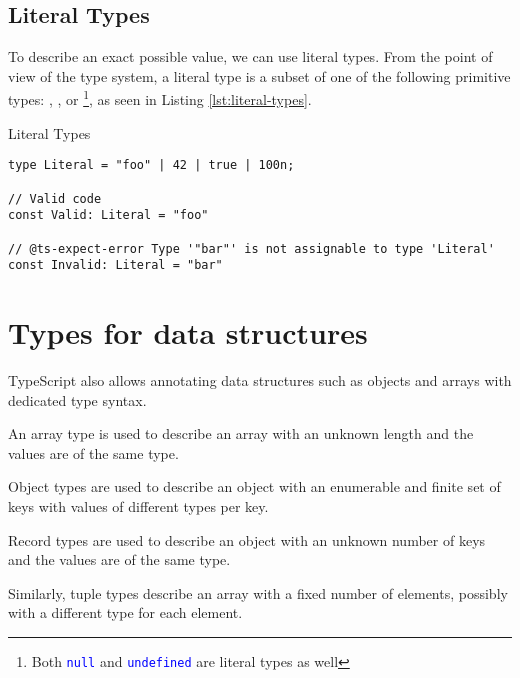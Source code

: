 \subsection{Literal Types}

To describe an exact possible value, we can use literal types. From the point of view of the type system, a literal type is a subset of one of the following primitive types: , ,  or \footnote{Both \texttt{\textcolor{blue}{null}} and \texttt{\textcolor{blue}{undefined}} are literal types as well}, as seen in Listing \ref{lst:literal-types}.

\begin{listing}[h]
  \caption{Literal Types}\label{lst:literal-types}
  \begin{verbatim}
type Literal = "foo" | 42 | true | 100n;

// Valid code
const Valid: Literal = "foo"

// @ts-expect-error Type '"bar"' is not assignable to type 'Literal'
const Invalid: Literal = "bar" 
\end{verbatim}
\end{listing}

\section{Types for data structures}

TypeScript also allows annotating data structures such as objects and arrays with dedicated type syntax.


An array type is used to describe an array with an unknown length and the values are of the same type.


Object types are used to describe an object with an enumerable and finite set of keys with values of different types per key.




Record types are used to describe an object with an unknown number of keys and the values are of the same type.


Similarly, tuple types describe an array with a fixed number of elements, possibly with a different type for each element.

